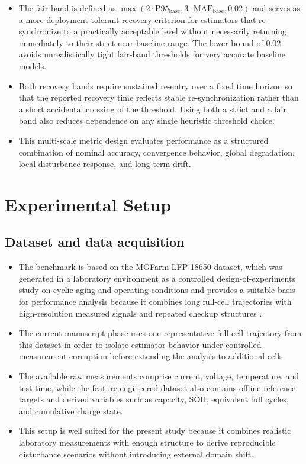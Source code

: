 \documentclass[review]{elsarticle}
\begin{document}
\begin{itemize}[leftmargin=*]
    \item The fair band is defined as $\max(2 \cdot \mathrm{P95}_{\mathrm{base}},3 \cdot \mathrm{MAE}_{\mathrm{base}},0.02)$ and serves as a more deployment-tolerant recovery criterion for estimators that re-synchronize to a practically acceptable level without necessarily returning immediately to their strict near-baseline range. The lower bound of $0.02$ avoids unrealistically tight fair-band thresholds for very accurate baseline models.
    \item Both recovery bands require sustained re-entry over a fixed time horizon so that the reported recovery time reflects stable re-synchronization rather than a short accidental crossing of the threshold. Using both a strict and a fair band also reduces dependence on any single heuristic threshold choice.
    \item This multi-scale metric design evaluates performance as a structured combination of nominal accuracy, convergence behavior, global degradation, local disturbance response, and long-term drift.
\end{itemize}

\section{Experimental Setup}
\subsection{Dataset and data acquisition}
\begin{itemize}[leftmargin=*]
    \item The benchmark is based on the MGFarm LFP 18650 dataset, which was generated in a laboratory environment as a controlled design-of-experiments study on cyclic aging and operating conditions and provides a suitable basis for performance analysis because it combines long full-cell trajectories with high-resolution measured signals and repeated checkup structures \cite{aqachtoulMGFARMIoTEdgeDriven2026,LFP_DoE_Cycle_Aging_Dataset,siebertzStatistischeVersuchsplanung2017}.
    \item The current manuscript phase uses one representative full-cell trajectory from this dataset in order to isolate estimator behavior under controlled measurement corruption before extending the analysis to additional cells.
    \item The available raw measurements comprise current, voltage, temperature, and test time, while the feature-engineered dataset also contains offline reference targets and derived variables such as capacity, SOH, equivalent full cycles, and cumulative charge state.
    \item This setup is well suited for the present study because it combines realistic laboratory measurements with enough structure to derive reproducible disturbance scenarios without introducing external domain shift.
\end{itemize}
\end{document}

